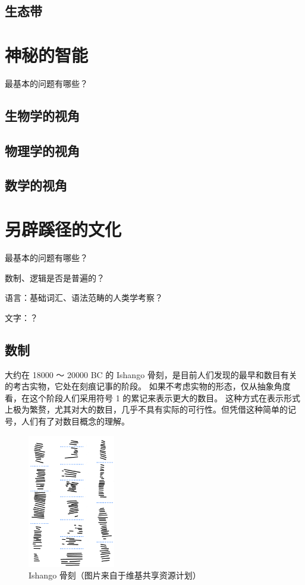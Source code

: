 \documentclass[a4paper,10.5pt]{book}
\begin{document}
\section{生态带}



\chapter{神秘的智能}

最基本的问题有哪些？

\section{生物学的视角}

\section{物理学的视角}

\section{数学的视角}



\chapter{另辟蹊径的文化}

最基本的问题有哪些？

数制、逻辑是否是普遍的？

语言：基础词汇、语法范畴的人类学考察？

文字：？

\section{数制}

大约在 18000 ～ 20000 BC 的 Ishango 骨刻，是目前人们发现的最早和数目有关的考古实物，它处在刻痕记事的阶段。
如果不考虑实物的形态，仅从抽象角度看，在这个阶段人们采用符号 1 的累记来表示更大的数目。
这种方式在表示形式上极为繁赘，尤其对大的数目，几乎不具有实际的可行性。但凭借这种简单的记号，人们有了对数目概念的理解。

\begin{figure}[ht]
\centering
\includegraphics[width=1.5in]{images/IshangoAllColumns.png}
\caption{Ishango 骨刻（图片来自于维基共享资源计划）}
\end{figure}
\end{document}
